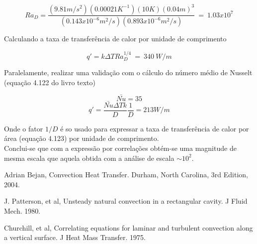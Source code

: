 \documentclass[12pt]{article}
\begin{document}
\begin{equation}
	Ra_{D}=\frac{(9.81 m/s^{2})(0.00021 K^{-1})(10K)(0.04m)^{3}}{(0.143x10^{-6}m^{2}/s)   (0.893x10^{-6}m^{2}/s)} \ = \ 1.03 x 10^{7}
\end{equation}

Calculando a taxa de transferência de calor por unidade de comprimento

\begin{equation}
	q' = k\Delta TRa_{D}^{1/4} \ = \ 340 \  W/m
\end{equation}

Paralelamente, realizar uma validação com o cálculo do número médio de Nusselt (equação 4.122 do livro texto)


\begin{equation}
	\bar{Nu} = 35
\end{equation}
\begin{equation}
	q' = \frac{\bar{Nu}\Delta T k}{D}\frac{1}{D}  = 213 W/m 
\end{equation}

Onde o fator $1/D$ é so usado para expressar a taxa de transferência de calor por área (equação 4.123) por unidade de comprimento. \\

Conclui-se que com a expressão por correlações obtém-se uma magnitude de mesma escala que aquela obtida com a análise de escala $\sim 10^{2}$.

\begin{thebibliography}{999}
	
	
	Adrian Bejan,
	Convection Heat Transfer.
	Durham, North Carolina,
	3rd Edition,
	2004.
	
	J. Patterson, et al,
	Unsteady natural convection in a rectangular cavity.
	J Fluid Mech.
	1980.
	
	Churchill, et al,
	Correlating equations for laminar and turbulent convection along a vertical surface.
	J Heat Mass Transfer.
	1975.
	
\end{thebibliography}
\end{document}
